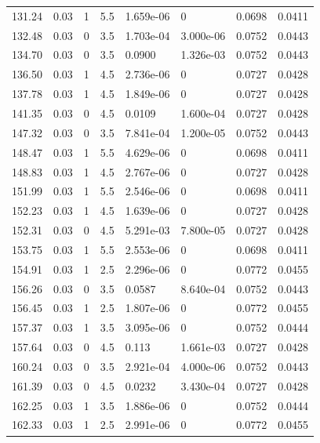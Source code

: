 \documentclass[preview]{standalone}
\begin{document}
{{{\begin{tabular}{L{1.2cm}C{1.2cm} C{0.3cm}C{0.5cm} C{1.4cm}C{1.4cm} C{1.4cm}C{1.4cm}}
  131.24  &  0.03  & 1     & 5.5 &  1.659e-06  & 0  & 0.0698 &  0.0411   \\ 
  132.48  &  0.03  & 0     & 3.5 &  1.703e-04  & 3.000e-06  & 0.0752 &  0.0443   \\ 
  134.70  &  0.03  & 0     & 3.5 &  0.0900  & 1.326e-03  & 0.0752 &  0.0443   \\ 
  136.50  &  0.03  & 1     & 4.5 &  2.736e-06  & 0  & 0.0727 &  0.0428   \\ 
  137.78  &  0.03  & 1     & 4.5 &  1.849e-06  & 0  & 0.0727 &  0.0428   \\ 
  141.35  &  0.03  & 0     & 4.5 &  0.0109  & 1.600e-04  & 0.0727 &  0.0428   \\ 
  147.32  &  0.03  & 0     & 3.5 &  7.841e-04  & 1.200e-05  & 0.0752 &  0.0443   \\ 
  148.47  &  0.03  & 1     & 5.5 &  4.629e-06  & 0  & 0.0698 &  0.0411   \\ 
  148.83  &  0.03  & 1     & 4.5 &  2.767e-06  & 0  & 0.0727 &  0.0428   \\ 
  151.99  &  0.03  & 1     & 5.5 &  2.546e-06  & 0  & 0.0698 &  0.0411   \\ 
  152.23  &  0.03  & 1     & 4.5 &  1.639e-06  & 0  & 0.0727 &  0.0428   \\ 
  152.31  &  0.03  & 0     & 4.5 &  5.291e-03  & 7.800e-05  & 0.0727 &  0.0428   \\ 
  153.75  &  0.03  & 1     & 5.5 &  2.553e-06  & 0  & 0.0698 &  0.0411   \\ 
  154.91  &  0.03  & 1     & 2.5 &  2.296e-06  & 0  & 0.0772 &  0.0455   \\ 
  156.26  &  0.03  & 0     & 3.5 &  0.0587  & 8.640e-04  & 0.0752 &  0.0443   \\ 
  156.45  &  0.03  & 1     & 2.5 &  1.807e-06  & 0  & 0.0772 &  0.0455   \\ 
  157.37  &  0.03  & 1     & 3.5 &  3.095e-06  & 0  & 0.0752 &  0.0444   \\ 
  157.64  &  0.03  & 0     & 4.5 &  0.113  & 1.661e-03  & 0.0727 &  0.0428   \\ 
  160.24  &  0.03  & 0     & 3.5 &  2.921e-04  & 4.000e-06  & 0.0752 &  0.0443   \\ 
  161.39  &  0.03  & 0     & 4.5 &  0.0232  & 3.430e-04  & 0.0727 &  0.0428   \\ 
  162.25  &  0.03  & 1     & 3.5 &  1.886e-06  & 0  & 0.0752 &  0.0444   \\ 
  162.33  &  0.03  & 1     & 2.5 &  2.991e-06  & 0  & 0.0772 &  0.0455   \\ 

\end{tabular}}}}
\end{document}
